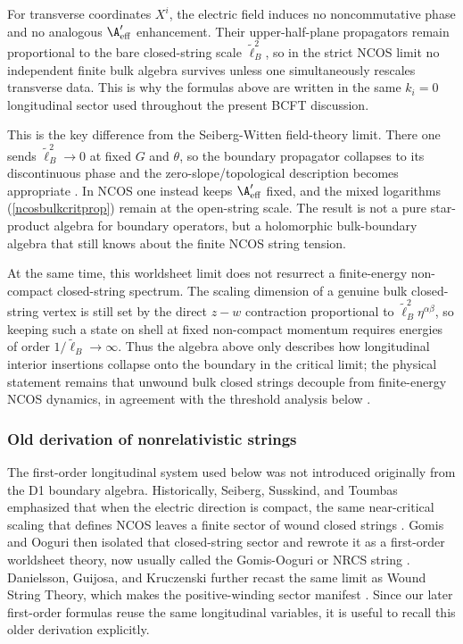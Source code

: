 \documentclass[12pt]{article}
\newcommand{\wt}[1]{\widetilde{#1}}
\begin{document}
For transverse coordinates $X^i$, the electric field induces no noncommutative phase and no analogous $\A'_{\rm eff}$ enhancement. Their upper-half-plane propagators remain proportional to the bare closed-string scale $\wt\ell_B^2$, so in the strict NCOS limit no independent finite bulk algebra survives unless one simultaneously rescales transverse data. This is why the formulas above are written in the same $k_i=0$ longitudinal sector used throughout the present BCFT discussion.

This is the key difference from the Seiberg-Witten field-theory limit. There one sends $\wt\ell_B^2\to0$ at fixed $G$ and $\theta$, so the boundary propagator collapses to its discontinuous phase and the zero-slope/topological description becomes appropriate \cite{seiberg1999stringtheorynoncommutativegeometry}. In NCOS one instead keeps $\A'_{\rm eff}$ fixed, and the mixed logarithms (\ref{ncosbulkcritprop}) remain at the open-string scale. The result is not a pure star-product algebra for boundary operators, but a holomorphic bulk-boundary algebra that still knows about the finite NCOS string tension.

At the same time, this worldsheet limit does not resurrect a finite-energy non-compact closed-string spectrum. The scaling dimension of a genuine bulk closed-string vertex is still set by the direct $z-w$ contraction proportional to $\wt\ell_B^2\eta^{\alpha\beta}$, so keeping such a state on shell at fixed non-compact momentum requires energies of order $1/\wt\ell_B\to\infty$. Thus the algebra above only describes how longitudinal interior insertions collapse onto the boundary in the critical limit; the physical statement remains that unwound bulk closed strings decouple from finite-energy NCOS dynamics, in agreement with the threshold analysis below \cite{seiberg2000stringsbackgroundelectricfield,gopakumar2000sdualitynoncommutativegaugetheory}.
\subsubsection{Old derivation of nonrelativistic strings}
\noindent
The first-order longitudinal system used below was not introduced originally from the D1 boundary algebra. Historically, Seiberg, Susskind, and Toumbas emphasized that when the electric direction is compact, the same near-critical scaling that defines NCOS leaves a finite sector of wound closed strings \cite{seiberg2000stringsbackgroundelectricfield}. Gomis and Ooguri then isolated that closed-string sector and rewrote it as a first-order worldsheet theory, now usually called the Gomis-Ooguri or NRCS string \cite{gomis2000nonrelativisticclosedstringtheory}. Danielsson, Guijosa, and Kruczenski further recast the same limit as Wound String Theory, which makes the positive-winding sector manifest \cite{danielsson2000iiabwoundwrapped}. Since our later first-order formulas reuse the same longitudinal variables, it is useful to recall this older derivation explicitly.
\end{document}
